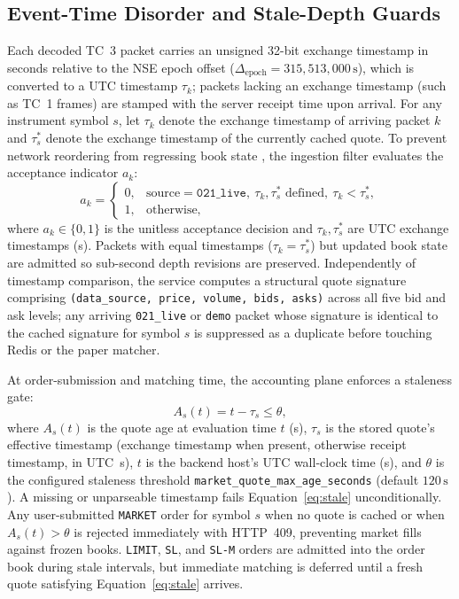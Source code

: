 \documentclass[journal,onecolumn,10pt]{IEEEtran}
\newcommand{\thinunit}[2]{#1\,\text{#2}}
\begin{document}
\subsection{Event-Time Disorder and Stale-Depth Guards}
Each decoded TC~3 packet carries an unsigned 32-bit exchange timestamp in seconds relative to the NSE epoch offset ($\Delta_{\mathrm{epoch}} = 315{,}513{,}000\,\text{s}$), which is converted to a UTC timestamp $\tau_k$; packets lacking an exchange timestamp (such as TC~1 frames) are stamped with the server receipt time upon arrival. For any instrument symbol $s$, let $\tau_k$ denote the exchange timestamp of arriving packet $k$ and $\tau^{*}_s$ denote the exchange timestamp of the currently cached quote. To prevent network reordering from regressing book state \cite{akidau2015,lamport1978}, the ingestion filter evaluates the acceptance indicator $a_k$:
\begin{equation}
a_k =
\begin{cases}
0, & \text{source}=\texttt{021\_live},\ \tau_k,\tau^{*}_s\text{ defined},\ \tau_k < \tau^{*}_s,\\
1, & \text{otherwise,}
\end{cases}
\label{eq:order}
\end{equation}
where $a_k\in\{0,1\}$ is the unitless acceptance decision and $\tau_k, \tau^{*}_s$ are UTC exchange timestamps (s). Packets with equal timestamps ($\tau_k = \tau^{*}_s$) but updated book state are admitted so sub-second depth revisions are preserved. Independently of timestamp comparison, the service computes a structural quote signature comprising \texttt{(data\_source, price, volume, bids, asks)} across all five bid and ask levels; any arriving \texttt{021\_live} or \texttt{demo} packet whose signature is identical to the cached signature for symbol $s$ is suppressed as a duplicate before touching Redis or the paper matcher.

At order-submission and matching time, the accounting plane enforces a staleness gate:
\begin{equation}
A_s(t) = t - \tau_s \le \theta,
\label{eq:stale}
\end{equation}
where $A_s(t)$ is the quote age at evaluation time $t$ (s), $\tau_s$ is the stored quote's effective timestamp (exchange timestamp when present, otherwise receipt timestamp, in UTC~s), $t$ is the backend host's UTC wall-clock time (s), and $\theta$ is the configured staleness threshold \texttt{market\_quote\_max\_age\_seconds} (default $\thinunit{120}{s}$). A missing or unparseable timestamp fails Equation~\eqref{eq:stale} unconditionally. Any user-submitted \texttt{MARKET} order for symbol $s$ when no quote is cached or when $A_s(t) > \theta$ is rejected immediately with HTTP~409, preventing market fills against frozen books. \texttt{LIMIT}, \texttt{SL}, and \texttt{SL-M} orders are admitted into the order book during stale intervals, but immediate matching is deferred until a fresh quote satisfying Equation~\eqref{eq:stale} arrives.
\end{document}

